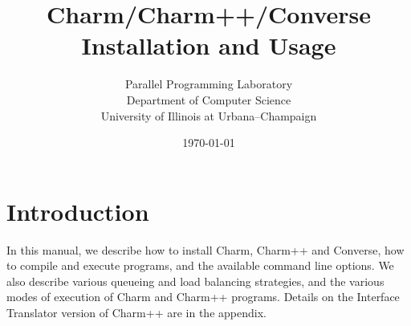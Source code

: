 %
%
%
%
%
%
%
%
%
%

\pagestyle{empty}
\setlength{\textwidth}{6.5in}
\setlength{\textheight}{9in}
\setlength{\parindent}{0in}
\setlength{\topmargin}{-.5in}
\parskip 0.1in
\newcommand{\zap}[1]{ }
\newcommand{\fcmd}{\bf}                 %
\newcommand{\fparm}{\bf\sf}             %
\newcommand{\fexec}{\bf}                %


 
\begin{titlepage}

\title{
\vspace*{3in}
Charm/Charm++/Converse Installation and Usage
}

\author{Parallel Programming Laboratory\\
	Department of Computer Science\\
	University of Illinois at Urbana--Champaign}
\date{\today}

\maketitle

\end{titlepage}

\newpage
\pagestyle{headings}

\section{Introduction}
In this manual, we describe how to install Charm, Charm++ and
Converse, how to compile and execute programs, and the available
command line options.  We also describe various queueing and load balancing
strategies, and the various modes of execution of Charm and Charm++
programs.  Details on the Interface Translator version of Charm++ are
in the appendix.





\appendix



